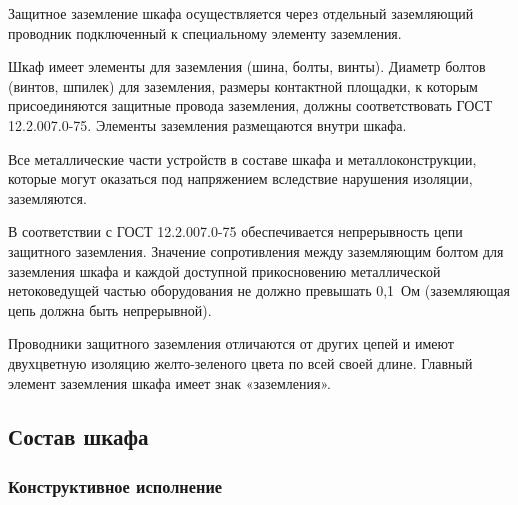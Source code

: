 \begin{enumsubsub}
\item Защитное заземление шкафа осуществляется через отдельный заземляющий проводник подключенный к специальному элементу заземления.
\item Шкаф имеет элементы для заземления (шина, болты, винты). Диаметр болтов (винтов, шпилек) для заземления, размеры контактной площадки, к которым присоединяются защитные провода заземления, должны соответствовать ГОСТ 12.2.007.0-75. Элементы заземления размещаются внутри шкафа.
\item Все металлические части устройств в составе шкафа и металлоконструкции, которые могут оказаться под напряжением вследствие нарушения изоляции, заземляются.
\item В соответствии с ГОСТ 12.2.007.0-75 обеспечивается непрерывность цепи защитного заземления. Значение сопротивления между заземляющим болтом для заземления шкафа и каждой доступной прикосновению металлической нетоковедущей частью оборудования не должно превышать 0,1~Ом (заземляющая цепь должна быть непрерывной).
\item Проводники защитного заземления отличаются от других цепей и имеют двухцветную изоляцию желто-зеленого цвета по всей своей длине. Главный элемент заземления шкафа имеет знак «заземления».
\end{enumsubsub}

{\color{unidarkgreen}\subsection{Состав шкафа}}

\subsubsection{Конструктивное исполнение}


